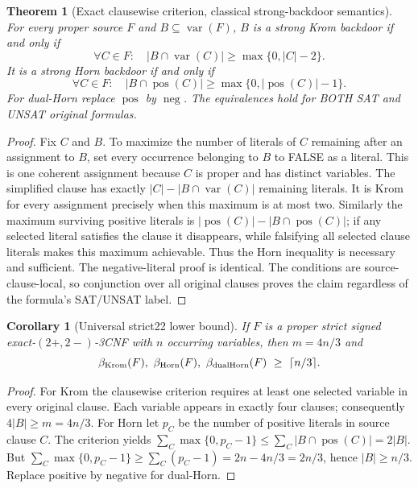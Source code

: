 \documentclass[11pt]{article}
\newtheorem{theorem}{Theorem}
\newtheorem{corollary}{Corollary}
\begin{document}
\begin{theorem}[Exact clausewise criterion, classical strong-backdoor semantics]
For every proper source $F$ and $B\subseteq\operatorname{var}(F)$, $B$ is a strong Krom backdoor if and only if
\[
 \forall C\in F:\quad |B\cap\operatorname{var}(C)|\ge\max\{0,|C|-2\}.
\]
It is a strong Horn backdoor if and only if
\[
 \forall C\in F:\quad |B\cap\operatorname{pos}(C)|\ge\max\{0,|\operatorname{pos}(C)|-1\}.
\]
For dual-Horn replace $\operatorname{pos}$ by $\operatorname{neg}$. The equivalences hold for BOTH SAT and UNSAT original formulas.
\end{theorem}
\begin{proof}
Fix $C$ and $B$. To maximize the number of literals of $C$ remaining after an assignment to $B$, set every occurrence belonging to $B$ to FALSE as a literal. This is one coherent assignment because $C$ is proper and has distinct variables. The simplified clause has exactly $|C|-|B\cap\operatorname{var}(C)|$ remaining literals. It is Krom for every assignment precisely when this maximum is at most two. Similarly the maximum surviving positive literals is $|\operatorname{pos}(C)|-|B\cap\operatorname{pos}(C)|$; if any selected literal satisfies the clause it disappears, while falsifying all selected clause literals makes this maximum achievable. Thus the Horn inequality is necessary and sufficient. The negative-literal proof is identical. The conditions are source-clause-local, so conjunction over all original clauses proves the claim regardless of the formula's SAT/UNSAT label.
\end{proof}

\begin{corollary}[Universal strict22 lower bound]
If $F$ is a proper strict signed exact-$(2+,2-)$-3CNF with $n$ occurring variables, then $m=4n/3$ and
\[
 \beta_{\rm Krom}(F),\ \beta_{\rm Horn}(F),\ \beta_{\rm dualHorn}(F)
 \ \ge\ \lceil n/3\rceil.
\]
\end{corollary}
\begin{proof}
For Krom the clausewise criterion requires at least one selected variable in every original clause. Each variable appears in exactly four clauses; consequently $4|B|\ge m=4n/3$. For Horn let $p_C$ be the number of positive literals in source clause $C$. The criterion yields $\sum_C\max\{0,p_C-1\}\le \sum_C|B\cap\operatorname{pos}(C)|=2|B|$. But $\sum_C\max\{0,p_C-1\}\ge\sum_C(p_C-1)=2n-4n/3=2n/3$, hence $|B|\ge n/3$. Replace positive by negative for dual-Horn.
\end{proof}
\end{document}

